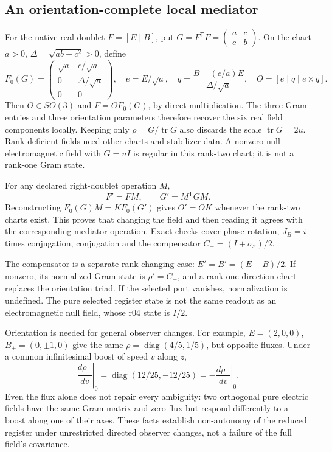 \subsection{An orientation-complete local mediator}
\label{subsec:v410-oriented-mediator}

For the native real doublet \(F=[E\mid B]\), put
\(G=F^{\mathsf T}F=\left(\begin{smallmatrix}a&c\\c&b\end{smallmatrix}\right)\).
On the chart \(a>0\), \(\Delta=\sqrt{ab-c^2}>0\), define
\[
 F_0(G)=\begin{pmatrix}\sqrt a&c/\sqrt a\\0&\Delta/\sqrt a\\0&0\end{pmatrix},
 \quad e=E/\sqrt a,\quad
 q=\frac{B-(c/a)E}{\Delta/\sqrt a},\quad O=[e\mid q\mid e\times q].
\]
Then \(O\in SO(3)\) and \(F=OF_0(G)\), by direct multiplication.
The three Gram entries and three orientation parameters therefore recover
the six real field components locally. Keeping only \(\rho=G/\operatorname{tr}G\)
also discards the scale \(\operatorname{tr}G=2u\). Rank-deficient fields
need other charts and stabilizer data. A nonzero null electromagnetic
field with \(G=uI\) is regular in this rank-two chart; it is not a
rank-one Gram state.

For any declared right-doublet operation \(M\),
\[
 F'=FM,\qquad G'=M^{\mathsf T}GM.
\]
Reconstructing \(F_0(G)M=K F_0(G')\) gives \(O'=OK\) whenever the
rank-two charts exist. This proves that changing the field and then
reading it agrees with the corresponding mediator operation. Exact checks
cover phase rotation, \(J_B=i\) times conjugation, conjugation and the
compensator \(C_+=(I+\sigma_x)/2\).

The compensator is a separate rank-changing case:
\(E'=B'=(E+B)/2\). If nonzero, its normalized Gram state is
\(\rho'=C_+\), and a rank-one direction chart replaces the orientation
triad. If the selected port vanishes, normalization is undefined.
The pure selected register state is not the same readout as an
electromagnetic null field, whose r04 state is \(I/2\).

Orientation is needed for general observer changes. For example,
\(E=(2,0,0)\), \(B_\pm=(0,\pm1,0)\) give the same
\(\rho=\operatorname{diag}(4/5,1/5)\), but opposite fluxes. Under a
common infinitesimal boost of speed \(v\) along \(z\),
\[
 \left.\frac{d\rho_+}{dv}\right|_0
 =\operatorname{diag}(12/25,-12/25)
 =-\left.\frac{d\rho_-}{dv}\right|_0.
\]
Even the flux alone does not repair every ambiguity: two orthogonal pure
electric fields have the same Gram matrix and zero flux but respond
differently to a boost along one of their axes. These facts establish
non-autonomy of the reduced register under unrestricted directed observer
changes, not a failure of the full field's covariance.

